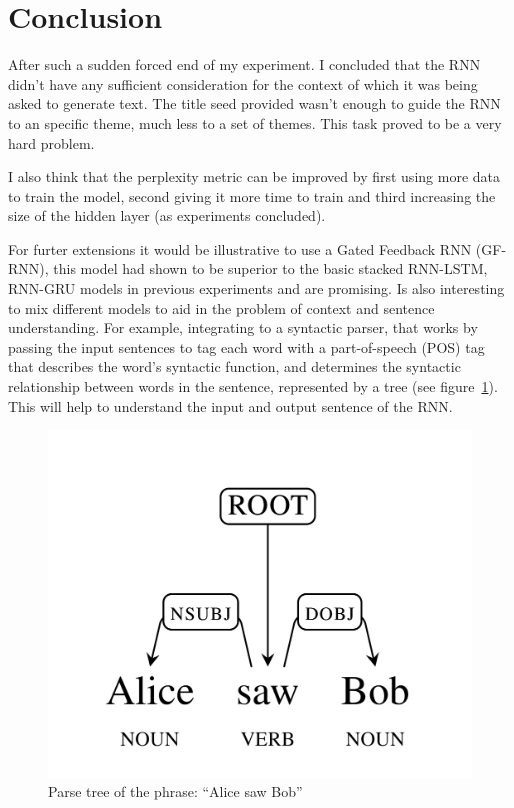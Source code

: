 \documentclass{article} %
\begin{document}
\section{Conclusion}
After such a sudden forced end of my experiment. I concluded that the RNN didn't
have any sufficient consideration for the context of which it was being asked to
generate text. The title seed provided wasn't enough to guide the RNN to an
specific theme, much less to a set of themes. This task proved to be a very hard
problem.

I also think that the perplexity metric can be improved by first using more
data to train the model, second giving it more time to train and third
increasing the size of the hidden layer (as experiments concluded).

For furter extensions it would be illustrative to use a Gated Feedback RNN (GF-RNN),
this model had shown to be superior to the basic stacked RNN-LSTM, RNN-GRU
models in previous experiments and are promising. Is also interesting to mix
different models to aid in the problem of context and sentence understanding.
For example, integrating to a syntactic parser, that works by passing the input
sentences to tag each word with a part-of-speech (POS) tag that describes the
word's syntactic function, and determines the syntactic relationship between
words in the sentence, represented by a tree (see figure~\ref{fig:parsetree}).
This will help to understand the input and output sentence of the RNN.

\begin{figure}[h]
\centering
\includegraphics[scale=0.1]{parse_tree}
\caption{Parse tree of the phrase: ``Alice saw Bob''}
\label{fig:parsetree}
\end{figure}
\end{document}
